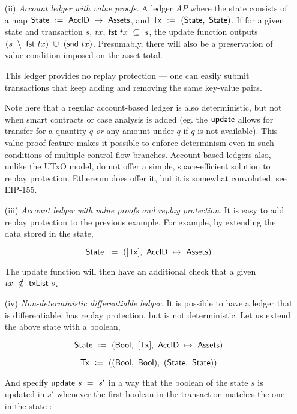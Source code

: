 \begin{itemize}
  \item[(ii)] \emph{Account ledger with value proofs.} A ledger $AP$ where the state consists of a
  map $\mathsf{State}~\mathrel{\mathop:}=~\mathsf{AccID}~\mapsto~\mathsf{Assets}$, and $\mathsf{Tx}~\mathrel{\mathop:}=~(\mathsf{State},~\mathsf{State})$.
  If for a given state and transaction $s,~tx$, $\mathsf{fst}~tx~\subseteq~s$, the
  update function outputs $(s~\setminus~\mathsf{fst}~tx)~\cup~(\mathsf{snd}~tx)$. Presumably,
  there will also be a preservation of value condition imposed on the asset total.

  This ledger provides no replay protection --- one can easily submit transactions
  that keep adding and removing the same key-value pairs.

  Note here that a regular account-based ledger is also deterministic, but not when
  smart contracts or case analysis is added (eg. the $\mathsf{update}$ allows for transfer
  for a quantity $q$ \emph{or} any amount under $q$ if $q$ is not available). This
  value-proof feature makes it possible to enforce determinism even in such
  conditions of multiple control flow branches. Account-based ledgers also, unlike
  the UTxO model, do not offer a simple, space-efficient solution to replay protection.
  Ethereum does offer it, but it is somewhat convoluted, see EIP-155. \\

  \item[(iii)] \emph{Account ledger with value proofs and replay protection}. It is easy to add
  replay protection to the previous example. For example, by extending the data
  stored in the state,

  \[ \mathsf{State}~\mathrel{\mathop:}=~([\mathsf{Tx}],~\mathsf{AccID}~\mapsto~\mathsf{Assets}) \]

  The update function will then have an additional check that a given $tx~\notin~\mathsf{txList}~s$. \\

  \item[(iv)] \emph{Non-deterministic differentiable ledger.} It is possible to have a ledger
  that is differentiable, has replay protection, but is not deterministic. Let us
  extend the above state with a boolean,

  \[ \mathsf{State}~\mathrel{\mathop:}=~(\mathsf{Bool},~[\mathsf{Tx}],~\mathsf{AccID}~\mapsto~\mathsf{Assets}) \]

  \[ \mathsf{Tx}~\mathrel{\mathop:}=~((\mathsf{Bool},~\mathsf{Bool}),~(\mathsf{State},~\mathsf{State})) \]

  And specify $\mathsf{update}~s~=~s'$ in a way that the boolean of the state $s$ is updated in $s'$ whenever
  the first boolean in the transaction matches the one in the state :


\end{itemize}
